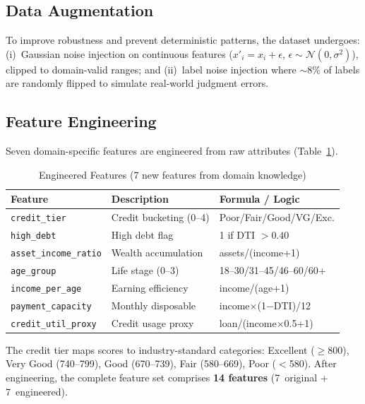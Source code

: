 \documentclass[journal]{IEEEtran}
\begin{document}
\subsection{Data Augmentation}

To improve robustness and prevent deterministic patterns, the dataset undergoes: (i)~Gaussian noise injection on continuous features ($x'_i = x_i + \epsilon$, $\epsilon \sim \mathcal{N}(0, \sigma^2)$), clipped to domain-valid ranges; and (ii)~label noise injection where $\sim$8\% of labels are randomly flipped to simulate real-world judgment errors.


\subsection{Feature Engineering}

Seven domain-specific features are engineered from raw attributes (Table~\ref{tab:engineered}).

\begin{table}[!t]
\centering
\caption{Engineered Features (7 new features from domain knowledge)}
\label{tab:engineered}
\begin{tabular}{lp{2.6cm}l}
\toprule
\textbf{Feature} & \textbf{Description} & \textbf{Formula / Logic} \\
\midrule
\texttt{credit\_tier} & Credit bucketing (0--4) & Poor/Fair/Good/VG/Exc. \\
\texttt{high\_debt} & High debt flag & 1 if DTI $> 0.40$ \\
\texttt{asset\_income\_ratio} & Wealth accumulation & assets/(income+1) \\
\texttt{age\_group} & Life stage (0--3) & 18--30/31--45/46--60/60+ \\
\texttt{income\_per\_age} & Earning efficiency & income/(age+1) \\
\texttt{payment\_capacity} & Monthly disposable & income$\times$(1$-$DTI)/12 \\
\texttt{credit\_util\_proxy} & Credit usage proxy & loan/(income$\times$0.5+1) \\
\bottomrule
\end{tabular}
\end{table}

The credit tier maps scores to industry-standard categories: Excellent ($\geq$800), Very Good (740--799), Good (670--739), Fair (580--669), Poor ($<$580). After engineering, the complete feature set comprises \textbf{14 features} (7~original + 7~engineered).
\end{document}
